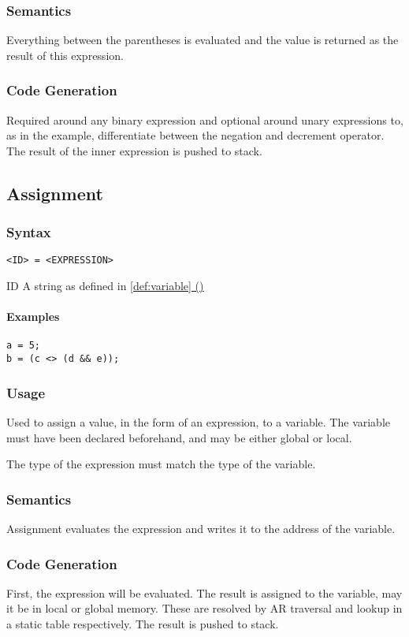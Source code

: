 \documentclass[twoside]{report}
\newcommand*{\fullref}[1]{\hyperref[{#1}]{\ref*{#1} (\nameref*{#1})}}
\newenvironment{mycompactdesc}{\begin{adjustwidth}{0.53cm}{}\begin{compactdesc}}{\end{compactdesc}\end{adjustwidth}}
\begin{document}
\subsubsection*{Semantics}
Everything between the parentheses is evaluated and the value is returned as the result of this expression.
\subsubsection*{Code Generation}
Required around any binary expression and optional around unary expressions to, as in the example, differentiate between the negation and decrement operator. The result of the inner expression is pushed to stack.


\subsection{Assignment}
\label{def:assignment}
\subsubsection*{Syntax}
\texttt{<ID> = <EXPRESSION>}
\begin{mycompactdesc}
	\item[ID] A string as defined in \fullref{def:variable}
\end{mycompactdesc}
\paragraph{Examples}
\begin{verbatim}
a = 5;
b = (c <> (d && e));
\end{verbatim}
\subsubsection*{Usage}
Used to assign a value, in the form of an expression, to a variable. The variable must have been declared beforehand, and may be either global or local.

The type of the expression must match the type of the variable.
\subsubsection*{Semantics}
Assignment evaluates the expression and writes it to the address of the variable.
\subsubsection*{Code Generation}
First, the expression will be evaluated. The result is assigned to the variable, may it be in local or global memory. These are resolved by AR traversal and lookup in a static table respectively. The result is pushed to stack.
\end{document}
